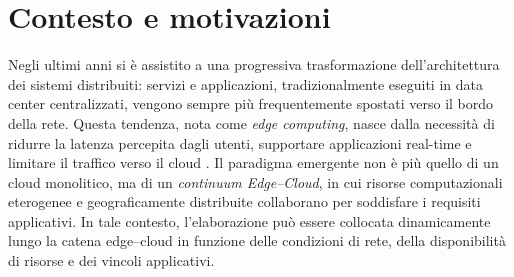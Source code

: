 \section{Contesto e motivazioni}
\label{sec:contesto_motivazioni}


Negli ultimi anni si è assistito a una progressiva trasformazione
dell'architettura dei sistemi distribuiti: servizi e applicazioni,
tradizionalmente eseguiti in data center centralizzati, vengono
sempre più frequentemente spostati verso il bordo della rete.
Questa tendenza, nota come \emph{edge computing}, nasce dalla
necessità di ridurre la latenza percepita dagli utenti, supportare
applicazioni real-time e limitare il traffico verso il cloud
\cite{Shi2016_EdgeVisionChallenges}.
Il paradigma emergente non è più quello di un cloud monolitico,
ma di un \emph{continuum Edge--Cloud}, in cui risorse computazionali
eterogenee e geograficamente distribuite collaborano per soddisfare
i requisiti applicativi. In tale contesto, l'elaborazione può essere
collocata dinamicamente lungo la catena edge--cloud in funzione delle
condizioni di rete, della disponibilità di risorse e dei vincoli
applicativi.






